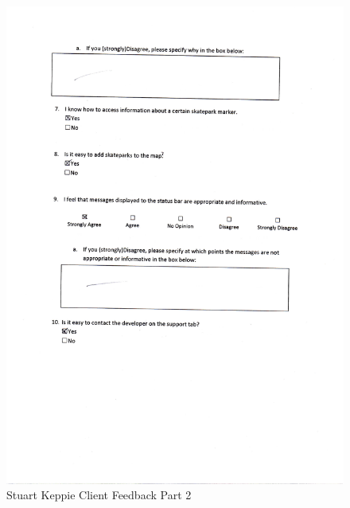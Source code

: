 \begin{figure}[H]
    \includegraphics[width=\textwidth]{./Evaluation/images/StuFeedback2.pdf}
    \caption{Stuart Keppie Client Feedback Part 2} \label{fig:StuFeedback2}
\end{figure}

